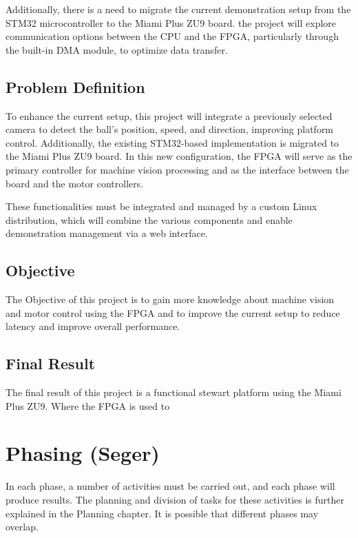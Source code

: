 \documentclass{article}
\begin{document}
Additionally, there is a need to migrate the current demonstration setup from
the STM32 microcontroller to the Miami Plus ZU9 board.
the project will explore communication options between the CPU and the FPGA,
particularly through the built-in DMA module, to optimize data transfer.

\subsection{Problem Definition} 

To enhance the current setup, this project will
integrate a previously selected camera to detect the ball's position, speed, and
direction, improving platform control. Additionally, the existing STM32-based
implementation is migrated to the Miami Plus ZU9 board. In this new
configuration, the FPGA will serve as the primary controller for machine vision
processing and as the interface between the board and the motor controllers.

These functionalities must be integrated and managed by a custom
Linux distribution, which will combine the various components and enable
demonstration management via a web interface.

\subsection{Objective}
The Objective of this project is to gain more knowledge about machine vision and motor control using the FPGA 
and to improve the current setup to reduce latency and improve overall performance.
\subsection{Final Result}
The final result of this project is a functional stewart platform using the Miami Plus ZU9.
Where the FPGA is used to 

\newpage
\section{Phasing (Seger)}
In each phase, a number of activities must be carried out, and each phase will produce results.
The planning and division of tasks for these activities is further explained in the Planning chapter.
It is possible that different phases may overlap.
\end{document}
